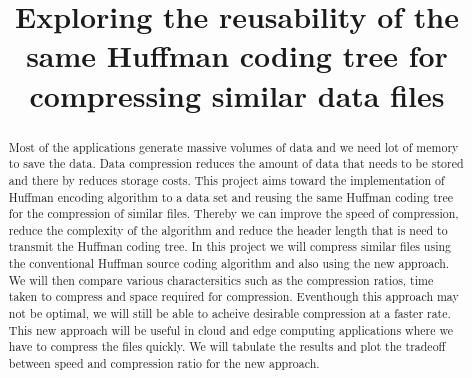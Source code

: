 \documentclass[10pt,conference]{IEEEtran}
\begin{document}
\title{Exploring the reusability of the same Huffman coding tree for compressing similar data files}
\author{
\and
{}
}

\maketitle
\begin{abstract}
\textnormal{
Most of the applications generate massive volumes of data and we need lot of memory to save the data. Data compression reduces the amount of data that needs to be stored and there by reduces storage costs. This project aims toward the implementation of Huffman encoding algorithm to a data set and reusing the same Huffman coding tree for the compression of similar files. Thereby we can improve the speed of compression, reduce the complexity of the algorithm and reduce the header length that is need to transmit the Huffman coding tree. In this project we will compress similar files using the conventional Huffman source coding algorithm and also using the new approach. We will then compare various charactersitics such as the compression ratios, time taken to compress and space required for compression. Eventhough this approach may not be optimal, we will still be able to acheive desirable compression at a faster rate. This new approach will be useful in cloud and edge computing applications where we have to compress the files quickly. We will tabulate the results and plot the tradeoff between speed and compression ratio for the new approach. 
}
\end{abstract}

\IEEEpeerreviewmaketitle
\end{document}
